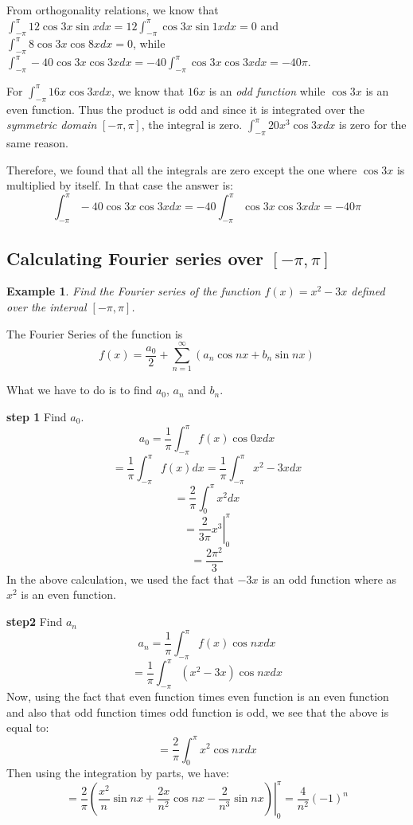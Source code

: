 \documentclass[12pt]{report}
\newtheorem{ex}{Example}[section]
\begin{document}
From orthogonality relations, we know that $\int_{-\pi}^{\pi} 12 \cos 3x \sin x dx = 12 \int_{-\pi}^{\pi} \cos 3x \sin 1x dx =0$ and $\int_{-\pi}^{\pi} 8 \cos 3x \cos 8x dx =0 $, while
$\int_{-\pi}^{\pi} -40 \cos 3x \cos 3x  dx =-40 \int_{-\pi}^{\pi} \cos 3x \cos 3x  dx =-40\pi$.

For $\int_{-\pi}^{\pi} 16 x \cos 3x dx$, we know that $16x$ is an \textit{odd function} while $\cos 3x$ is an even function. Thus the product is odd and since it is integrated over the \textit{symmetric domain} $[-\pi, \pi]$, the integral is zero. $\int_{-\pi}^{\pi} 20 x^3 \cos 3x dx $ is zero for the same reason.

Therefore, we found that all the integrals are zero except the one where $\cos 3x$ is multiplied by itself. In that case the answer is:
$$\int_{-\pi}^{\pi} -40 \cos 3x \cos 3x  dx =-40 \int_{-\pi}^{\pi} \cos 3x \cos 3x  dx =-40\pi$$

\subsection*{Calculating Fourier series over  $[-\pi, \pi]$}

\begin{ex} Find the Fourier series of the function $f(x) = x^2 -3x$ defined over the interval $[-\pi, \pi]$.
\end{ex}
The Fourier Series of the function is
$$f(x) = \frac{a_0}{2} + \sum_{n=1}^{\infty} \left( a_n \cos nx + b_n \sin nx \right) $$

What we have to do is to find $a_0$, $a_n$ and $b_n$.

\textbf{step 1} Find $a_0$.
$$a_0 = \frac{1}{\pi} \int_{-\pi}^{\pi} f(x) \cos 0x dx$$
$$= \frac{1}{\pi} \int_{-\pi}^{\pi} f(x)dx = \frac{1}{\pi} \int_{-\pi}^{\pi} x^2 -3x dx$$
$$= \frac{2}{\pi} \int_{0}^{\pi} x^2 dx$$
$$= \left. \frac{2}{3\pi} x^3 \right\vert_0^{\pi}$$
$$= \frac{2 \pi^2}{3}$$
In the above calculation, we used the fact that $-3x$ is an odd function where as $x^2$ is an even function.

\textbf{step2} Find $a_n$
$$a_n = \frac{1}{\pi} \int_{-\pi}^{\pi} f(x) \cos nx dx$$
$$= \frac{1}{\pi} \int_{-\pi}^{\pi} (x^2 -3x) \cos nx dx$$
Now, using the fact that even function times even function is an even function and also that odd function times odd function is odd, we see that the above is equal to:
$$ = \frac{2}{\pi} \int_{0}^{\pi} x^2 \cos nx dx$$
Then using the integration by parts, we have:
$$= \frac{2}{\pi} \left. \left(\frac{x^2}{n} \sin nx + \frac{2x}{n^2} \cos nx - \frac{2}{n^3} \sin nx \right) \right\vert_{0}^{\pi} = \frac{4}{n^2} (-1)^n $$
\end{document}
